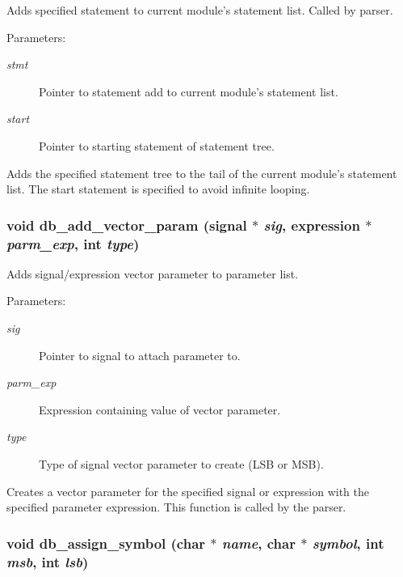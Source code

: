 Adds specified statement to current module's statement list. Called by parser. 

\begin{Desc}
\item[Parameters:]
\begin{description}
\item[{\em stmt}]Pointer to statement add to current module's statement list. \item[{\em start}]Pointer to starting statement of statement tree.\end{description}
\end{Desc}
Adds the specified statement tree to the tail of the current module's statement list. The start statement is specified to avoid infinite looping. 
\subsubsection{\setlength{\rightskip}{0pt plus 5cm}void db\_\-add\_\-vector\_\-param ({\bf signal} $\ast$ {\em sig}, {\bf expression} $\ast$ {\em parm\_\-exp}, int {\em type})}\label{db_8h_a6}


Adds signal/expression vector parameter to parameter list. 

\begin{Desc}
\item[Parameters:]
\begin{description}
\item[{\em sig}]Pointer to signal to attach parameter to. \item[{\em parm\_\-exp}]Expression containing value of vector parameter. \item[{\em type}]Type of signal vector parameter to create (LSB or MSB).\end{description}
\end{Desc}
Creates a vector parameter for the specified signal or expression with the specified parameter expression. This function is called by the parser. 
\subsubsection{\setlength{\rightskip}{0pt plus 5cm}void db\_\-assign\_\-symbol (char $\ast$ {\em name}, char $\ast$ {\em symbol}, int {\em msb}, int {\em lsb})}\label{db_8h_a22}


